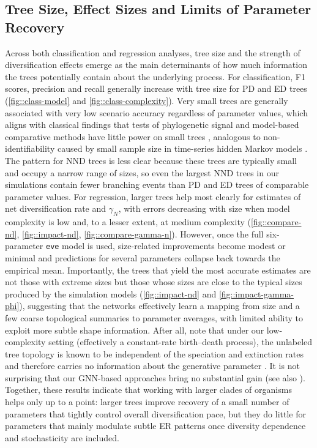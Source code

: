 {\subsection{Tree Size, Effect Sizes and Limits of Parameter Recovery}
\label{ch3::sec::discussion::tree-size-effect-sizes}
Across both classification and regression analyses, tree size and the strength of diversification effects emerge as the main determinants of how much information the trees potentially contain about the underlying process. For classification, F1 scores, precision and recall generally increase with tree size for PD and ED trees (\autoref{fig::class-model} and \autoref{fig::class-complexity}). Very small trees are generally associated with very low scenario accuracy regardless of parameter values, which aligns with classical findings that tests of phylogenetic signal and model-based comparative methods have little power on small trees \citep{blomberg_testing_2003, townsend_phylogenetic_2012}, analogous to non-identifiability caused by small sample size in time-series hidden Markov models \cite{cole_parameter_2019}. The pattern for NND trees is less clear because these trees are typically small and occupy a narrow range of sizes, so even the largest NND trees in our simulations contain fewer branching events than PD and ED trees of comparable parameter values. For regression, larger trees help most clearly for estimates of net diversification rate and $\gamma_N$, with errors decreasing with size when model complexity is low and, to a lesser extent, at medium complexity (\autoref{fig::compare-nd}, \autoref{fig::impact-nd}, \autoref{fig::compare-gamma-n}). However, once the full six-parameter \texttt{eve} model is used, size-related improvements become modest or minimal and predictions for several parameters collapse back towards the empirical mean. Importantly, the trees that yield the most accurate estimates are not those with extreme sizes but those whose sizes are close to the typical sizes produced by the simulation models (\autoref{fig::impact-nd} and \autoref{fig::impact-gamma-phi}), suggesting that the networks effectively learn a mapping from size and a few coarse topological summaries to parameter averages, with limited ability to exploit more subtle shape information. After all, note that under our low-complexity setting (effectively a constant-rate birth--death process), the unlabeled tree topology is known to be independent of the speciation and extinction rates and therefore carries no information about the generative parameter \citep{steel_properties_2001,gernhard_conditioned_2008}. It is not surprising that our GNN-based approaches bring no substantial gain (see also \citep{qin_parameter_2025}). Together, these results indicate that working with larger clades of organisms helps only up to a point: larger trees improve recovery of a small number of parameters that tightly control overall diversification pace, but they do little for parameters that mainly modulate subtle ER patterns once diversity dependence and stochasticity are included.

}
